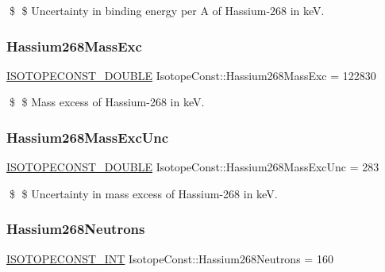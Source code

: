 \$ \$ Uncertainty in binding energy per A of Hassium-\/268 in keV. \mbox{\label{group___isotope_const-_hassium-_hs268_ga5e6d6327fcdd2d3dd9dffd70e379df58}} 
\subsubsection{\texorpdfstring{Hassium268\+Mass\+Exc}{Hassium268MassExc}}
{\footnotesize\ttfamily \mbox{\hyperlink{group___isotope_const-_macros_ga8f45a7272ce02c0b4c65c44636ed719a}{I\+S\+O\+T\+O\+P\+E\+C\+O\+N\+S\+T\+\_\+\+D\+O\+U\+B\+LE}} Isotope\+Const\+::\+Hassium268\+Mass\+Exc = 122830}

\$ \$ Mass excess of Hassium-\/268 in keV. \mbox{\label{group___isotope_const-_hassium-_hs268_gaa6e74944f4f5ff068cb2200e9b577d48}} 
\subsubsection{\texorpdfstring{Hassium268\+Mass\+Exc\+Unc}{Hassium268MassExcUnc}}
{\footnotesize\ttfamily \mbox{\hyperlink{group___isotope_const-_macros_ga8f45a7272ce02c0b4c65c44636ed719a}{I\+S\+O\+T\+O\+P\+E\+C\+O\+N\+S\+T\+\_\+\+D\+O\+U\+B\+LE}} Isotope\+Const\+::\+Hassium268\+Mass\+Exc\+Unc = 283}

\$ \$ Uncertainty in mass excess of Hassium-\/268 in keV. \mbox{\label{group___isotope_const-_hassium-_hs268_gad9e3555f55caf2ad578a85fa415a3c31}} 
\subsubsection{\texorpdfstring{Hassium268\+Neutrons}{Hassium268Neutrons}}
{\footnotesize\ttfamily \mbox{\hyperlink{group___isotope_const-_macros_ga5f18360b3e99483a35c32d789e62621c}{I\+S\+O\+T\+O\+P\+E\+C\+O\+N\+S\+T\+\_\+\+I\+NT}} Isotope\+Const\+::\+Hassium268\+Neutrons = 160}

